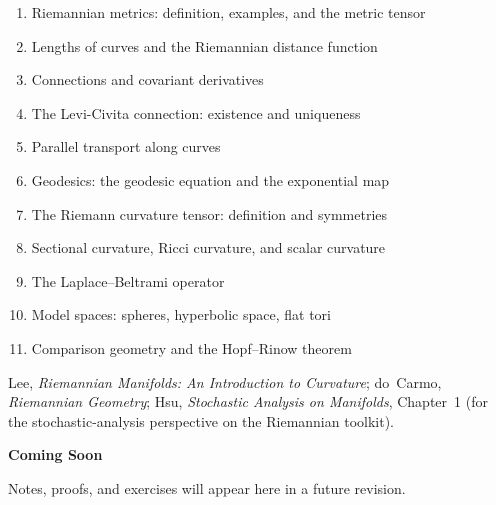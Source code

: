 \begin{enumerate}
  \item Riemannian metrics: definition, examples, and the metric tensor
  \item Lengths of curves and the Riemannian distance function
  \item Connections and covariant derivatives
  \item The Levi-Civita connection: existence and uniqueness
  \item Parallel transport along curves
  \item Geodesics: the geodesic equation and the exponential map
  \item The Riemann curvature tensor: definition and symmetries
  \item Sectional curvature, Ricci curvature, and scalar curvature
  \item The Laplace--Beltrami operator
  \item Model spaces: spheres, hyperbolic space, flat tori
  \item Comparison geometry and the Hopf--Rinow theorem
\end{enumerate}

\begin{remark*}
Lee, \textit{Riemannian Manifolds: An Introduction to Curvature};
do~Carmo, \textit{Riemannian Geometry};
Hsu, \textit{Stochastic Analysis on Manifolds}, Chapter~1
(for the stochastic-analysis perspective on the Riemannian toolkit).
\end{remark*}

\vspace{1em}
\begin{tcolorbox}[
  colback=gray!6, colframe=gray!40, arc=2pt,
  left=8pt, right=8pt, top=6pt, bottom=6pt,
  title={\small\textbf{Status: Planned}},
  fonttitle=\small\bfseries
]
\begin{center}\Large\bfseries Coming Soon\end{center}
\vspace{6pt}
\noindent Notes, proofs, and exercises will appear here in a future revision.
\end{tcolorbox}

% 
% 
% 
% 
% 
% 
